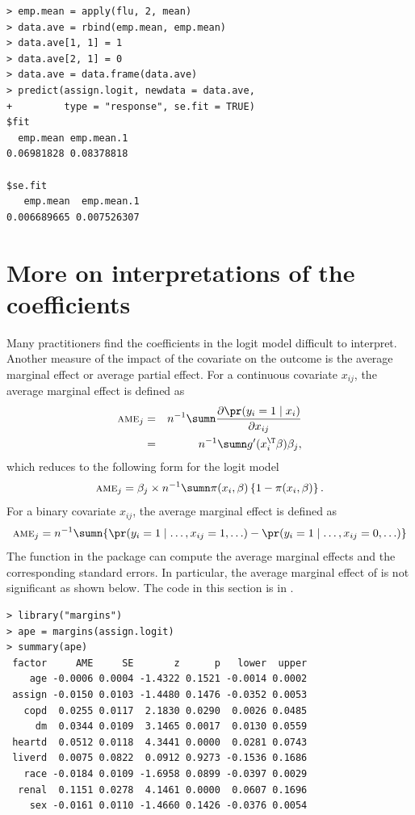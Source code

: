 \begin{lstlisting}
> emp.mean = apply(flu, 2, mean)
> data.ave = rbind(emp.mean, emp.mean)
> data.ave[1, 1] = 1
> data.ave[2, 1] = 0
> data.ave = data.frame(data.ave)
> predict(assign.logit, newdata = data.ave,
+         type = "response", se.fit = TRUE)
$fit
  emp.mean emp.mean.1 
0.06981828 0.08378818 

$se.fit
   emp.mean  emp.mean.1 
0.006689665 0.007526307 
\end{lstlisting}



\section{More on interpretations of the coefficients}

Many practitioners find the coefficients in the logit model difficult to interpret. Another measure of the impact of the covariate on the outcome is the average marginal effect or average partial effect. For a continuous covariate $x_{ij}$, the average marginal effect is defined as 
\begin{eqnarray*}
\textsc{ame}_j 
&=& 
n^{-1}\sumn\frac{\partial\pr(y_{i}=1\mid x_{i})}{\partial x_{ij}} \\
&=& 
n^{-1}\sumn g'(x_{i}^{\T}\beta)\beta_{j},
\end{eqnarray*}
which reduces to the following form for the logit model
\[
\textsc{ame}_j = 
\beta_{j}\times n^{-1}\sumn\pi(x_{i},\beta)\left\{ 1-\pi(x_{i},\beta)\right\} .
\]
For a binary covariate $x_{ij}$, the average marginal effect is defined as 
$$
\textsc{ame}_j = 
n^{-1}\sumn  \{  \pr(y_{i}=1\mid  \ldots, x_{ij}=1, \ldots) - \pr(y_{i}=1\mid  \ldots, x_{ij}=0, \ldots )  \} 
$$
The  function in the  package can compute the average marginal effects and the corresponding standard errors. In particular, the average marginal effect of  is not significant as shown below. The  code in this section is in . 


\begin{lstlisting}
> library("margins")
> ape = margins(assign.logit)
> summary(ape)
 factor     AME     SE       z      p   lower  upper
    age -0.0006 0.0004 -1.4322 0.1521 -0.0014 0.0002
 assign -0.0150 0.0103 -1.4480 0.1476 -0.0352 0.0053
   copd  0.0255 0.0117  2.1830 0.0290  0.0026 0.0485
     dm  0.0344 0.0109  3.1465 0.0017  0.0130 0.0559
 heartd  0.0512 0.0118  4.3441 0.0000  0.0281 0.0743
 liverd  0.0075 0.0822  0.0912 0.9273 -0.1536 0.1686
   race -0.0184 0.0109 -1.6958 0.0899 -0.0397 0.0029
  renal  0.1151 0.0278  4.1461 0.0000  0.0607 0.1696
    sex -0.0161 0.0110 -1.4660 0.1426 -0.0376 0.0054
\end{lstlisting}    

